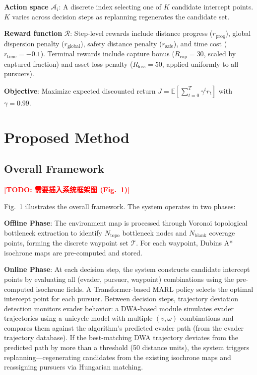 \documentclass[10pt,conference]{IEEEtran}
\newcommand{\marktodo}[1]{\textcolor{red}{\textbf{[TODO: #1]}}}
\begin{document}
\textbf{Action space} $\mathcal{A}_i$: A discrete index selecting one of $K$ candidate intercept points. $K$ varies across decision steps as replanning regenerates the candidate set.

\textbf{Reward function} $\mathcal{R}$: Step-level rewards include distance progress ($r_{\text{prog}}$), global dispersion penalty ($r_{\text{global}}$), safety distance penalty ($r_{\text{safe}}$), and time cost ($r_{\text{time}} = -0.1$). Terminal rewards include capture bonus ($R_{\text{cap}} = 30$, scaled by captured fraction) and asset loss penalty ($R_{\text{loss}} = 50$, applied uniformly to all pursuers).

\textbf{Objective}: Maximize expected discounted return $J = \mathbb{E}\left[\sum_{t=0}^{T} \gamma^t r_t\right]$ with $\gamma = 0.99$.

\section{Proposed Method}

\subsection{Overall Framework}

\marktodo{需要插入系统框架图 (Fig.~1)}

Fig.~1 illustrates the overall framework. The system operates in two phases:

\textbf{Offline Phase}: The environment map is processed through Voronoi topological bottleneck extraction to identify $N_{\text{topo}}$ bottleneck nodes and $N_{\text{blank}}$ coverage points, forming the discrete waypoint set $\mathcal{T}$. For each waypoint, Dubins A* isochrone maps are pre-computed and stored.

\textbf{Online Phase}: At each decision step, the system constructs candidate intercept points by evaluating all (evader, pursuer, waypoint) combinations using the pre-computed isochrone fields. A Transformer-based MARL policy selects the optimal intercept point for each pursuer. Between decision steps, trajectory deviation detection monitors evader behavior: a DWA-based module simulates evader trajectories using a unicycle model with multiple $(v, \omega)$ combinations and compares them against the algorithm's predicted evader path (from the evader trajectory database). If the best-matching DWA trajectory deviates from the predicted path by more than a threshold (50 distance units), the system triggers replanning---regenerating candidates from the existing isochrone maps and reassigning pursuers via Hungarian matching.
\end{document}
